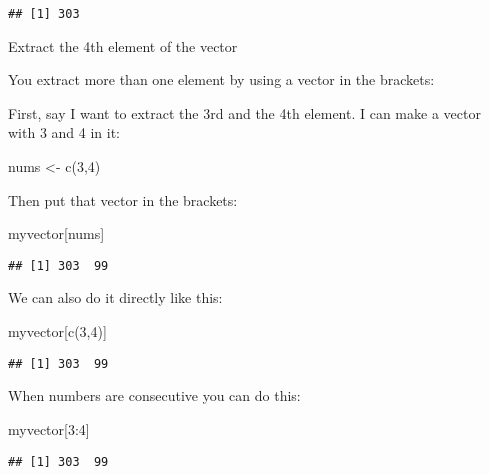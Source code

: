 \documentclass[
]{book}
\newenvironment{Shaded}{\begin{snugshade}}{\end{snugshade}}
\newcommand{\DecValTok}[1]{\textcolor[rgb]{0.00,0.00,0.81}{#1}}
\newcommand{\FunctionTok}[1]{\textcolor[rgb]{0.00,0.00,0.00}{#1}}
\newcommand{\NormalTok}[1]{#1}
\newcommand{\OtherTok}[1]{\textcolor[rgb]{0.56,0.35,0.01}{#1}}
\newcommand{\SpecialCharTok}[1]{\textcolor[rgb]{0.00,0.00,0.00}{#1}}
\begin{document}
\begin{verbatim}
## [1] 303
\end{verbatim}

Extract the 4th element of the vector

You extract more than one element by using a vector in the brackets:

First, say I want to extract the 3rd and the 4th element. I can make a vector with 3 and 4 in it:

\begin{Shaded}
\begin{Highlighting}[]
\NormalTok{nums }\OtherTok{\textless{}{-}} \FunctionTok{c}\NormalTok{(}\DecValTok{3}\NormalTok{,}\DecValTok{4}\NormalTok{)}
\end{Highlighting}
\end{Shaded}

Then put that vector in the brackets:

\begin{Shaded}
\begin{Highlighting}[]
\NormalTok{myvector[nums]}
\end{Highlighting}
\end{Shaded}

\begin{verbatim}
## [1] 303  99
\end{verbatim}

We can also do it directly like this:

\begin{Shaded}
\begin{Highlighting}[]
\NormalTok{myvector[}\FunctionTok{c}\NormalTok{(}\DecValTok{3}\NormalTok{,}\DecValTok{4}\NormalTok{)]}
\end{Highlighting}
\end{Shaded}

\begin{verbatim}
## [1] 303  99
\end{verbatim}

When numbers are consecutive you can do this:

\begin{Shaded}
\begin{Highlighting}[]
\NormalTok{myvector[}\DecValTok{3}\SpecialCharTok{:}\DecValTok{4}\NormalTok{]}
\end{Highlighting}
\end{Shaded}

\begin{verbatim}
## [1] 303  99
\end{verbatim}
\end{document}
